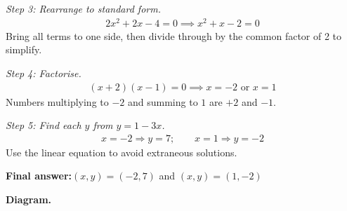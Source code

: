 \documentclass[11pt]{article}
\begin{document}
\textit{Step 3: Rearrange to standard form.}
\[\begin{gathered}
2x^2 + 2x - 4 = 0 \implies x^2 + x - 2 = 0
\end{gathered}\]
Bring all terms to one side, then divide through by the common factor of 2 to simplify.

\textit{Step 4: Factorise.}
\[\begin{gathered}
(x + 2)(x - 1) = 0 \implies x = -2 \text{ or } x = 1
\end{gathered}\]
Numbers multiplying to \( -2 \) and summing to \( 1 \) are \( +2 \) and \( -1 \).

\textit{Step 5: Find each \( y \) from \( y = 1 - 3x \).}
\[\begin{gathered}
x = -2 \Rightarrow y = 7; \qquad x = 1 \Rightarrow y = -2
\end{gathered}\]
Use the linear equation to avoid extraneous solutions.

\begin{answerbox}
\textbf{Final answer:}\quad \(\displaystyle (x, y) = (-2, 7)\) and \(\displaystyle (x, y) = (1, -2)\)
\end{answerbox}
\textbf{Diagram.}
\end{document}
